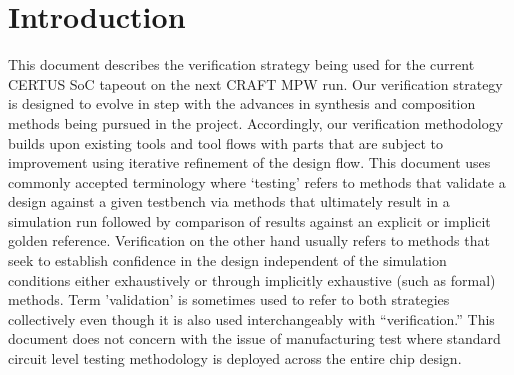 
\section{Introduction}

This document describes the verification strategy being used for the
current CERTUS SoC tapeout on the next CRAFT MPW run.  Our verification strategy is designed to evolve in step with the advances in synthesis and composition methods being pursued in the project. Accordingly, our verification methodology builds upon existing tools and tool flows with parts that are subject to improvement using iterative refinement of the design flow. This document uses commonly accepted terminology where `testing' refers to methods that validate a design against a given testbench via methods that ultimately result in a simulation run followed by comparison of results against an explicit or implicit golden reference. Verification on the other hand usually refers to methods that seek to establish confidence in the design independent of the simulation conditions either exhaustively or through implicitly exhaustive (such as formal) methods. Term 'validation' is sometimes used to refer to both strategies collectively even though it is also used interchangeably with ``verification.'' This document does not concern with the issue of manufacturing test where standard circuit level testing methodology is deployed across the entire chip design.




